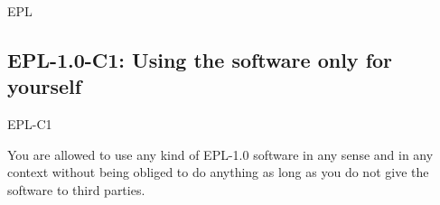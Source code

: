 \begin{license}{EPL}
\newcommand{\markAllModifications}{Mark all modifications of the source code of
  the program thoroughly; namely within the modified source code.}

\newcommand{\organizeYourModifications}{Organize your modifications in a way
  that they are covered by the existing EPL-1.0 licensing statements.}
\newcommand{\addHeaderToNewFiles}{If you add new source code files, insert a
  header containing your copyright line and an EPL-1.0 adequate licensing the
  statement.} 

\newcommand{\useSeparateDirectory}[1]{Arrange your #1 distribution so that the
  integrated EPL-1.0 and the \emph{licensing files} clearly refer only to the
  embedded library and do not disturb the licensing of your own overarching
  work. It's a good tradition to keep the embedded components like libraries,
  modules, snippets, or plugins in separate directories which also contains all 
  additional licensing elements.}

\subsection{EPL-1.0-C1: Using the software only for yourself}
\begin{lsuc}{EPL-C1}



  \begin{lsucrequiresnothing}
    \item You are allowed to use any kind of EPL-1.0 software in any sense and in
    any context without being obliged to do anything as long as you do not
    give the software to third parties.
  \end{lsucrequiresnothing}


\end{lsuc}
\end{license}
